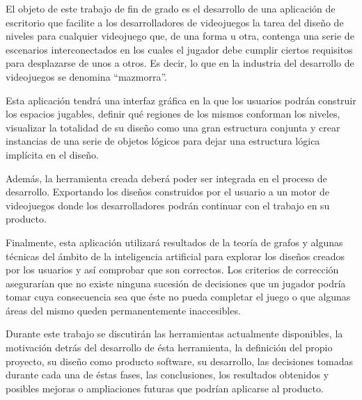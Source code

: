 El objeto de este trabajo de fin de grado es el desarrollo de una aplicación de escritorio que facilite a los desarrolladores de videojuegos la tarea del diseño de niveles para cualquier videojuego que, de una forma u otra, contenga una serie de escenarios interconectados en los cuales el jugador debe cumplir ciertos requisitos para desplazarse de unos a otros. Es decir, lo que en la industria del desarrollo de videojuegos se denomina ``mazmorra''.

Esta aplicación tendrá una interfaz gráfica en la que los usuarios podrán construir los espacios jugables, definir qué regiones de los mismos conforman los niveles, visualizar la totalidad de su diseño como una gran estructura conjunta y crear instancias de una serie de objetos lógicos para dejar una estructura lógica implícita en el diseño.

Además, la herramienta creada deberá poder ser integrada en el proceso de desarrollo. Exportando los diseños construidos por el usuario a un motor de videojuegos donde los desarrolladores podrán continuar con el trabajo en su producto.

Finalmente, esta aplicación utilizará resultados de la teoría de grafos y algunas técnicas del ámbito de la inteligencia artificial para explorar los diseños creados por los usuarios y así comprobar que son correctos. Los criterios de corrección asegurarían que no existe ninguna sucesión de decisiones que un jugador podría tomar cuya consecuencia sea que éste no pueda completar el juego o que algunas áreas del mismo queden permanentemente inaccesibles.

Durante este trabajo se discutirán las herramientas actualmente disponibles, la motivación detrás del desarrollo de ésta herramienta, la definición del propio proyecto, su diseño como producto software, su desarrollo, las decisiones tomadas durante cada una de éstas fases, las conclusiones, los resultados obtenidos y posibles mejoras o ampliaciones futuras que podrían aplicarse al producto.



